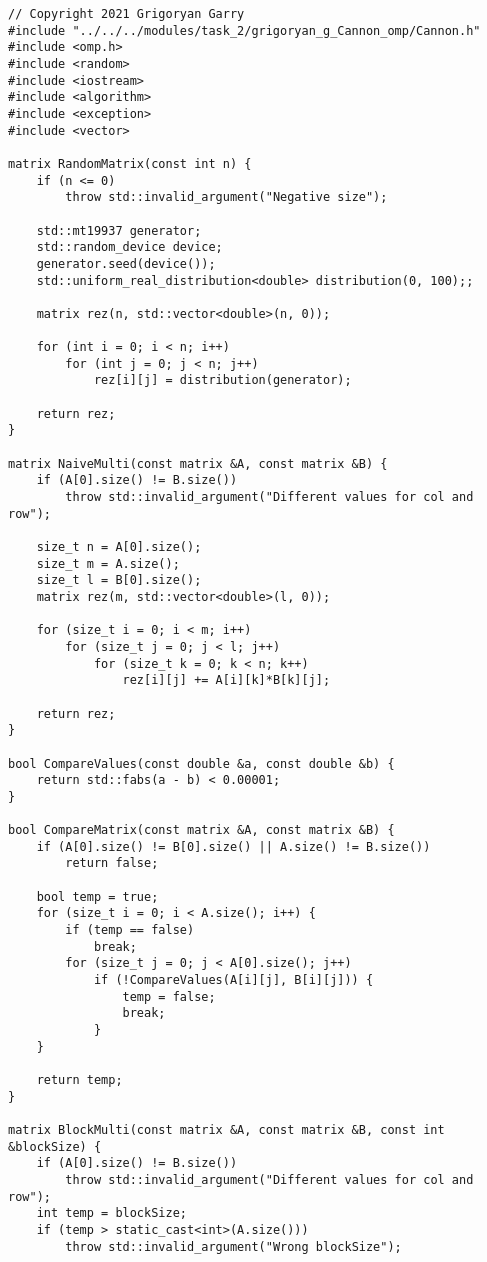 \documentclass{report}
\begin{document}
\begin{lstlisting}
// Copyright 2021 Grigoryan Garry
#include "../../../modules/task_2/grigoryan_g_Cannon_omp/Cannon.h"
#include <omp.h>
#include <random>
#include <iostream>
#include <algorithm>
#include <exception>
#include <vector>

matrix RandomMatrix(const int n) {
    if (n <= 0)
        throw std::invalid_argument("Negative size");

    std::mt19937 generator;
    std::random_device device;
    generator.seed(device());
    std::uniform_real_distribution<double> distribution(0, 100);;

    matrix rez(n, std::vector<double>(n, 0));

    for (int i = 0; i < n; i++)
        for (int j = 0; j < n; j++)
            rez[i][j] = distribution(generator);

    return rez;
}

matrix NaiveMulti(const matrix &A, const matrix &B) {
    if (A[0].size() != B.size())
        throw std::invalid_argument("Different values for col and row");

    size_t n = A[0].size();
    size_t m = A.size();
    size_t l = B[0].size();
    matrix rez(m, std::vector<double>(l, 0));

    for (size_t i = 0; i < m; i++)
        for (size_t j = 0; j < l; j++)
            for (size_t k = 0; k < n; k++)
                rez[i][j] += A[i][k]*B[k][j];

    return rez;
}

bool CompareValues(const double &a, const double &b) {
    return std::fabs(a - b) < 0.00001;
}

bool CompareMatrix(const matrix &A, const matrix &B) {
    if (A[0].size() != B[0].size() || A.size() != B.size())
        return false;

    bool temp = true;
    for (size_t i = 0; i < A.size(); i++) {
        if (temp == false)
            break;
        for (size_t j = 0; j < A[0].size(); j++)
            if (!CompareValues(A[i][j], B[i][j])) {
                temp = false;
                break;
            }
    }

    return temp;
}

matrix BlockMulti(const matrix &A, const matrix &B, const int &blockSize) {
    if (A[0].size() != B.size())
        throw std::invalid_argument("Different values for col and row");
    int temp = blockSize;
    if (temp > static_cast<int>(A.size()))
        throw std::invalid_argument("Wrong blockSize");


\end{lstlisting}
\end{document}
